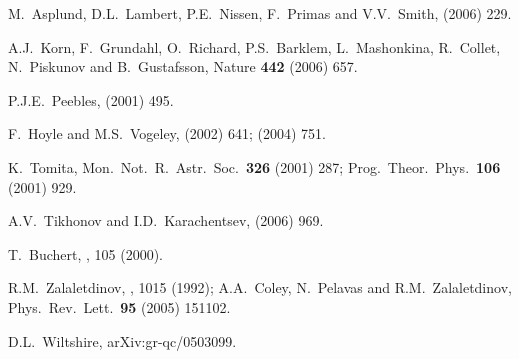 \documentclass[12pt]{article}
\begin{document}
\begin{thebibliography}{66}
M.~Asplund, D.L.~Lambert, P.E.~Nissen, F.~Primas and V.V.~Smith,
 (2006) 229. %

A.J.~Korn, F.~Grundahl, O.~Richard, P.S.~Barklem, L.~Mashonkina, R.~Collet,
N.~Piskunov and B.~Gustafsson,
Nature {\bf442} (2006) 657. %

P.J.E.~Peebles,
 (2001) 495. %

F.~Hoyle and M.S.~Vogeley,
 (2002) 641; %
 (2004) 751. %

K.~Tomita,
Mon.\ Not.\ R.\ Astr.\ Soc.\ {\bf326} (2001) 287; %
Prog.\ Theor.\ Phys.\ {\bf106} (2001) 929. %

A.V.~Tikhonov and I.D.~Karachentsev,
 (2006) 969. %

T.~Buchert,
, 105 (2000). %

R.M.~Zalaletdinov,
, 1015 (1992);
A.A.~Coley, N.~Pelavas and R.M.~Zalaletdinov,
Phys.\ Rev.\ Lett.\ {\bf 95} (2005) 151102.

D.L.~Wiltshire,
arXiv:gr-qc/0503099.


\end{thebibliography}
\end{document}
